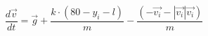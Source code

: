 \documentclass[preview]{standalone}
\begin{document}
\begin{center}
$$\frac{d\vec{v}}{dt}=\vec{g}+\frac{k\cdot(80-y_i-l)}{m}-\frac{(-\vec{v_i}-|\vec{v_i}|\vec{v_i})}{m}$$
\end{center}
\end{document}
